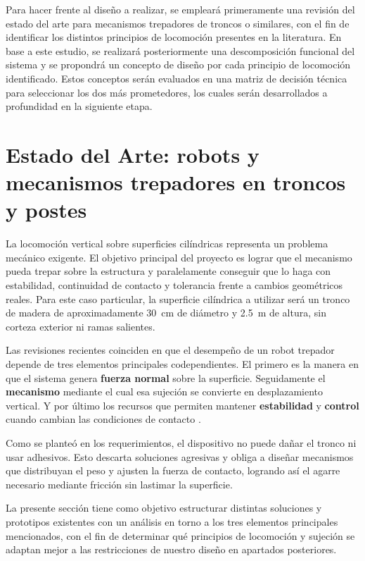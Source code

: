 \documentclass[lettersize,journal]{IEEEtran}
\begin{document}
Para hacer frente al diseño a realizar, se empleará primeramente una revisión del
estado del arte para mecanismos trepadores de troncos o similares, con el fin de
identificar los distintos principios de locomoción presentes en la literatura. En base
a este estudio, se realizará posteriormente una descomposición funcional del sistema y se propondrá un concepto de diseño por cada principio de locomoción identificado. Estos conceptos serán evaluados en una matriz de decisión técnica para seleccionar los dos más prometedores,
los cuales serán desarrollados a profundidad en la siguiente etapa.

\section{\textbf{Estado del Arte: robots y mecanismos trepadores en troncos y postes}}
\label{sec:estado_del_arte}

La locomoción vertical sobre superficies cilíndricas representa un problema mecánico
exigente. El objetivo principal del proyecto es lograr que el mecanismo pueda trepar
sobre la estructura y paralelamente conseguir que lo haga con estabilidad, continuidad
de contacto y tolerancia frente a cambios geométricos reales. Para este caso particular,
la superficie cilíndrica a utilizar será un tronco de madera de aproximadamente
\SI{30}{\centi\meter} de diámetro y \SI{2.5}{\meter} de altura, sin corteza exterior
ni ramas salientes.

Las revisiones recientes coinciden en que el desempeño de un robot trepador depende de
tres elementos principales codependientes. El primero es la manera en que el sistema
genera \textbf{fuerza normal} sobre la superficie. Seguidamente el \textbf{mecanismo}
mediante el cual esa sujeción se convierte en desplazamiento vertical. Y por último los
recursos que permiten mantener \textbf{estabilidad} y \textbf{control} cuando cambian
las condiciones de contacto \cite{FangCheng2023,DaiEtAl2023}.

Como se planteó en los requerimientos, el dispositivo no puede dañar el tronco ni usar
adhesivos. Esto descarta soluciones agresivas y obliga a diseñar mecanismos que
distribuyan el peso y ajusten la fuerza de contacto, logrando así el agarre necesario
mediante fricción sin lastimar la superficie.

La presente sección tiene como objetivo estructurar distintas soluciones y prototipos
existentes con un análisis en torno a los tres elementos principales mencionados, con
el fin de determinar qué principios de locomoción y sujeción se adaptan mejor a las
restricciones de nuestro diseño en apartados posteriores.
\end{document}
